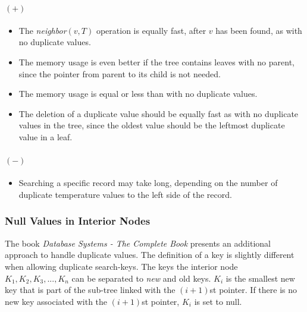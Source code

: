 \documentclass[abstracton,12pt]{scrreprt}
\begin{document}
\paragraph{$(+)$}
\begin{itemize}  
	\item  The \emph{neighbor}$(v,T)$ operation is equally fast, after $v$ has been found, as with no duplicate values. 
	\item The memory usage is even better if the tree contains leaves with no parent, since the pointer from parent to its child is not needed. 
	\item The memory usage is equal or less than with no duplicate values. 
	\item The deletion of a duplicate value should be equally fast as with no duplicate values in the tree, since the oldest value should be the leftmost duplicate value in a leaf. 
\end{itemize}
\paragraph{$(-)$}
\begin{itemize}  
	\item  Searching a specific record may take long, depending on the number of duplicate temperature values to the left side of the record. 
\end{itemize}

\subsubsection{Null Values in Interior Nodes}
\label{Null Values}
The book \emph{Database Systems - The Complete Book} \cite{BTreeBook} presents an additional approach to handle duplicate values. The definition of a key is slightly different when allowing duplicate search-keys. The keys the interior node $K_1, K_2, K_3, ... , K_n$ can be separated to \emph{new} and old keys. $K_i$ is the smallest new key that is part of the sub-tree linked with the $(i+1)$st pointer. If there is no new key associated with the $(i+1)$st pointer, $K_i$ is set to null. 
\end{document}
